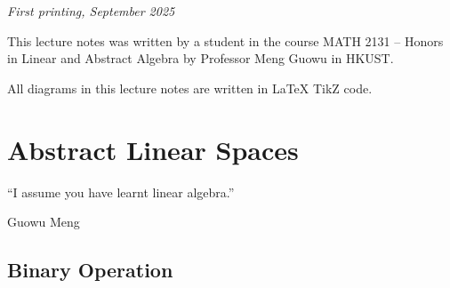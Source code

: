 \documentclass[
	11pt, %
	fleqn, %
	a4paper, %
]{LegrandOrangeBook}
\begin{document}
\noindent \textit{First printing, September 2025} %


\pagestyle{empty} %

\tableofcontents %

\cleardoublepage %

\pagestyle{fancy} %

\newpage


\vspace{8pt}

\noindent This lecture notes was written by a student in the course MATH 2131 -- Honors in Linear and Abstract Algebra by Professor Meng Guowu in HKUST. 

\noindent All diagrams in this lecture notes are written in LaTeX TikZ code.

\cleardoublepage %


\chapterspaceabove{8cm} %
\chapterspacebelow{8cm} %

\chapter{Abstract Linear Spaces}

\epigraph{``I assume you have learnt linear algebra.''}{Guowu Meng}

\section{Binary Operation}
\end{document}
